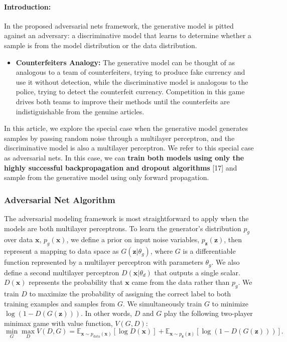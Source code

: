 \paragraph*{Introduction: }

In the proposed adversarial nets framework, the generative model is pitted against an adversary: a discriminative model that learns to determine whether a sample is from the model distribution or the data distribution.
\begin{itemize}
\item \textbf{Counterfeiters Analogy: } The generative model can be thought of as analogous to a team of counterfeiters, trying to produce fake currency and use it without detection, while the discriminative model is analogous to the police, trying to detect the counterfeit currency. Competition in this game drives both teams to improve their methods until the counterfeits are indistiguishable from the genuine articles.
\end{itemize}
In this article, we explore the special case when the generative model generates samples by passing random noise through a multilayer perceptron, and the discriminative model is also a multilayer perceptron. We refer to this special case as adversarial nets. In this case, we can \textbf{train both models using only the highly successful backpropagation and dropout algorithms} [17] and sample from the generative model using only forward propagation.

\subsubsection*{Adversarial Net Algorithm}
The adversarial modeling framework is most straightforward to apply when the models are both multilayer perceptrons. To learn the generator’s distribution $p_g$ over data $\bm{x}$, $p_g(\bm{x})$, we define a prior on input noise variables, $p_{\bm{z}}(\bm{z})$, then represent a mapping to data space as $G(\bm{z}| \theta_g)$, where $G$ is a differentiable function represented by a multilayer perceptron with parameters $\theta_g$. We also define a second multilayer perceptron $D(\bm{x} | \theta_d)$ that outputs a single scalar. $D(\bm{x})$ represents the probability that $\bm{x}$ came from the data rather than $p_g$. We train $D$ to maximize the probability of assigning the correct label to both training examples and samples from $G$. We simultaneously train $G$ to minimize $ \log(1 - D(G(\bm{z})))$. In other words, $D$ and $G$ play the following two-player minimax game with value function, $V(G,D)$:
\[
	\min_G\max_D V(D,G) =
	\mathbb{E}_{\bm{x}\sim p_{\text{data}}(\bm{x})}
	\left[ \log D(\bm{x}) \right]
	+
	\mathbb{E}_{\bm{x}\sim p_{\bm{z}}(\bm{z})}
	\left[ \log\left( 1 - D(G(\bm{z})) \right) \right].
\]


